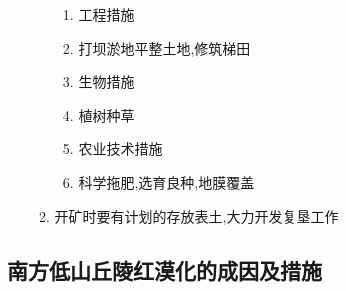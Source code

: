 \documentclass[a4paper]{article}
\begin{document}
\begin{enumerate}
\begin{enumerate}
            \begin{enumerate}
                \item 工程措施
                    \item 打坝淤地平整土地,修筑梯田
                \item 生物措施
                    \item 植树种草
                \item 农业技术措施
                    \item 科学拖肥,选育良种,地膜覆盖
            \end{enumerate}
            \item 开矿时要有计划的存放表土,大力开发复垦工作
        \end{enumerate}
    \end{enumerate}
    \subsection{南方低山丘陵红漠化的成因及措施}
\end{document}
